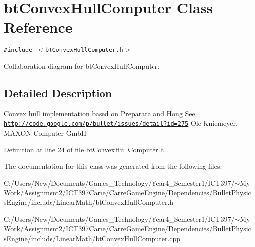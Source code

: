 \hypertarget{classbt_convex_hull_computer}{
\section{btConvexHullComputer Class Reference}
\label{classbt_convex_hull_computer}
}
{\tt \#include $<$btConvexHullComputer.h$>$}

Collaboration diagram for btConvexHullComputer:

\subsection{Detailed Description}
Convex hull implementation based on Preparata and Hong See \href{http://code.google.com/p/bullet/issues/detail?id=275}{\tt http://code.google.com/p/bullet/issues/detail?id=275} Ole Kniemeyer, MAXON Computer GmbH 

Definition at line 24 of file btConvexHullComputer.h.

The documentation for this class was generated from the following files:\begin{CompactItemize}
\item 
C:/Users/New/Documents/Games\_\-Technology/Year4\_\-Semester1/ICT397/$\sim$My Work/Assignment2/ICT397Carre/CarreGameEngine/Dependencies/BulletPhysicsEngine/include/LinearMath/btConvexHullComputer.h\item 
C:/Users/New/Documents/Games\_\-Technology/Year4\_\-Semester1/ICT397/$\sim$My Work/Assignment2/ICT397Carre/CarreGameEngine/Dependencies/BulletPhysicsEngine/include/LinearMath/btConvexHullComputer.cpp\end{CompactItemize}

